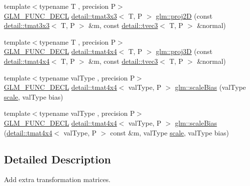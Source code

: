 \begin{DoxyCompactItemize}
\item 
{\footnotesize template$<$typename T , precision P$>$ }\\\hyperlink{setup_8hpp_ab2d052de21a70539923e9bcbf6e83a51}{G\+L\+M\+\_\+\+F\+U\+N\+C\+\_\+\+D\+E\+CL} \hyperlink{structglm_1_1detail_1_1tmat3x3}{detail\+::tmat3x3}$<$ T, P $>$ \hyperlink{group__gtx__transform2_gad51e1fa33875b966db2f97cb7f21c48a}{glm\+::proj2D} (const \hyperlink{structglm_1_1detail_1_1tmat3x3}{detail\+::tmat3x3}$<$ T, P $>$ \&m, const \hyperlink{structglm_1_1detail_1_1tvec3}{detail\+::tvec3}$<$ T, P $>$ \&normal)
\item 
{\footnotesize template$<$typename T , precision P$>$ }\\\hyperlink{setup_8hpp_ab2d052de21a70539923e9bcbf6e83a51}{G\+L\+M\+\_\+\+F\+U\+N\+C\+\_\+\+D\+E\+CL} \hyperlink{structglm_1_1detail_1_1tmat4x4}{detail\+::tmat4x4}$<$ T, P $>$ \hyperlink{group__gtx__transform2_ga70a21b940727b94060fd3826eeacb048}{glm\+::proj3D} (const \hyperlink{structglm_1_1detail_1_1tmat4x4}{detail\+::tmat4x4}$<$ T, P $>$ \&m, const \hyperlink{structglm_1_1detail_1_1tvec3}{detail\+::tvec3}$<$ T, P $>$ \&normal)
\item 
{\footnotesize template$<$typename val\+Type , precision P$>$ }\\\hyperlink{setup_8hpp_ab2d052de21a70539923e9bcbf6e83a51}{G\+L\+M\+\_\+\+F\+U\+N\+C\+\_\+\+D\+E\+CL} \hyperlink{structglm_1_1detail_1_1tmat4x4}{detail\+::tmat4x4}$<$ val\+Type, P $>$ \hyperlink{group__gtx__transform2_ga0a387ae1a7fd1a2ca451ac47833ee3e2}{glm\+::scale\+Bias} (val\+Type \hyperlink{group__gtc__matrix__transform_gabd40959f269abd16c256a4f59ab03d62}{scale}, val\+Type bias)
\item 
{\footnotesize template$<$typename val\+Type , precision P$>$ }\\\hyperlink{setup_8hpp_ab2d052de21a70539923e9bcbf6e83a51}{G\+L\+M\+\_\+\+F\+U\+N\+C\+\_\+\+D\+E\+CL} \hyperlink{structglm_1_1detail_1_1tmat4x4}{detail\+::tmat4x4}$<$ val\+Type, P $>$ \hyperlink{group__gtx__transform2_gae733630f90c53ca3dce8daf50f25d6ab}{glm\+::scale\+Bias} (\hyperlink{structglm_1_1detail_1_1tmat4x4}{detail\+::tmat4x4}$<$ val\+Type, P $>$ const \&m, val\+Type \hyperlink{group__gtc__matrix__transform_gabd40959f269abd16c256a4f59ab03d62}{scale}, val\+Type bias)
\end{DoxyCompactItemize}


\subsection{Detailed Description}
Add extra transformation matrices. 

